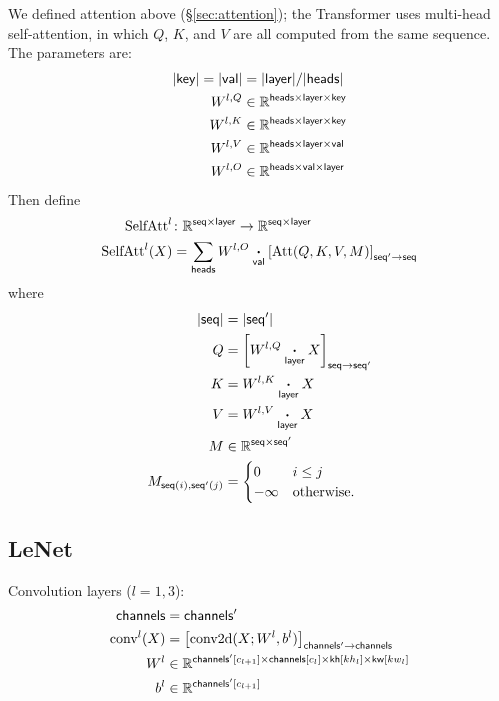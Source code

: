 \documentclass{article}
\newcommand{\reals}{\mathbb{R}}
\begin{document}
We defined attention above (\S\ref{sec:attention}); the Transformer uses multi-head self-attention, in which $Q$, $K$, and $V$ are all computed from the same sequence. The parameters are:
\begin{align*}
  |\name{key}| = |\name{val}| &= |\name{layer}|/|\name{heads}| \\
  W^{l,Q} &\in \mathbb{R}^{\name{heads} \times \name{layer} \times \name{key}} \\
  W^{l,K} &\in \mathbb{R}^{\name{heads} \times \name{layer} \times \name{key}} \\
  W^{l,V} &\in \mathbb{R}^{\name{heads} \times \name{layer} \times \name{val}} \\
  W^{l,O} &\in \mathbb{R}^{\name{heads} \times \name{val} \times \name{layer}}
\end{align*}
Then define
\begin{align*}
  \text{SelfAtt}^l &\colon \mathbb{R}^{\name{seq} \times \name{layer}} \rightarrow \mathbb{R}^{\name{seq} \times \name{layer}} \\
  \text{SelfAtt}^l(X) &= \nsum{heads} W^{l,O} \ndot{val} \nmov{seq'}{seq}{\text{Att}(Q, K, V, M)}
\end{align*}
where
\begin{align*}
  |\name{seq}| &= |\name{seq'}| \\
  Q &= \nmov{seq}{seq'}{W^{l,Q} \ndot{layer} X} \\
  K &= W^{l,K} \ndot{layer} X \\
  V &= W^{l,V} \ndot{layer} X \\
  M & \in \reals^{\name{seq} \times \name{seq'}} \\
  M_{\nidx{seq}{i}, \nidx{seq'}{j}} &= \begin{cases}
    0 & i \leq j\\
    -\infty & \text{otherwise.}
  \end{cases}
\end{align*}

\subsection{LeNet}

Convolution layers ($l = 1, 3$):
\begin{align*}
\name{channels} &= \name{channels'} \\  
\text{conv}^l(X) &= \nmov{channels'}{channels}{\text{conv2d}(X; W^l, b^l)} \\
W^l & \in \reals^{\nset{channels'}{c_{l+1}} \times \nset{channels}{c_l} \times \nset{kh}{kh_l} \times \nset{kw}{kw_l}} \\
b^l &\in \reals^{\nset{channels'}{c_{l+1}}}
\end{align*}
\end{document}
